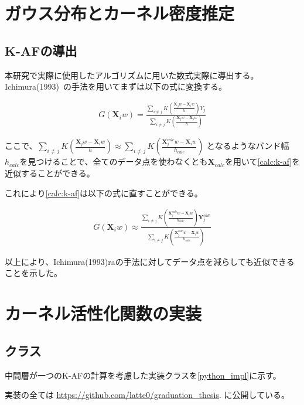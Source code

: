 \appendix
\chapter{ガウス分布とカーネル密度推定}


\section{K-AFの導出}
\label{appendix:calc}

本研究で実際に使用したアルゴリズムに用いた数式実際に導出する。
Ichimura(1993)~\cite{ichimura}の手法を用いてまずは以下の式に変換する。


\begin{eqnarray}
G(\mathbf{X}_iw)=\frac{\sum_{i\neq j} K\left(\frac{\mathbf{X}_j w - \mathbf{X}_i w}{h}\right)Y_j}{\sum_{i\neq j} K\left(\frac{\mathbf{X}_j w - \mathbf{X}_i w}{h}\right)}
\label{calc:k-af}
\end{eqnarray}

ここで、$ \sum_{i\neq j} K\left(\frac{\mathbf{X}_j w - \mathbf{X}_i w}{h}\right) \approx	\sum_{i\neq j} K\left(\frac{\mathbf{X}^{calc}_j w - \mathbf{X}_i w}{h_{calc}}\right)$
となるようなバンド幅$ h_{calc} $を見つけることで、全てのデータ点を使わなくとも$ \mathbf{X}_{calc} $を用いて\ref{calc:k-af}を近似することができる。

これにより\ref{calc:k-af}は以下の式に直すことができる。

\begin{eqnarray}
G(\mathbf{X}_iw) \approx \frac{\sum_{i\neq j} K\left(\frac{\mathbf{X}^{calc}_j w - \mathbf{X}_i w}{h_{calc}}\right)\mathbf{Y}^{calc}_j}{\sum_{i\neq j} K\left(\frac{\mathbf{X}^{calc}_j w - \mathbf{X}_i w}{h_{calc}}\right)}
\label{calc:k-af-2}
\end{eqnarray}

以上により、Ichimura(1993)raの手法に対してデータ点を減らしても近似できることを示した。


\chapter{カーネル活性化関数の実装}
\label{appendix:algorithm}


\section{クラス}


中間層が一つのK-AFの計算を考慮した実装クラスを\ref{python_impl}に示す。

実装の全ては \href{https://github.com/latte0/graduation\_thesis}{https://github.com/latte0/graduation\_thesis}. に公開している。

